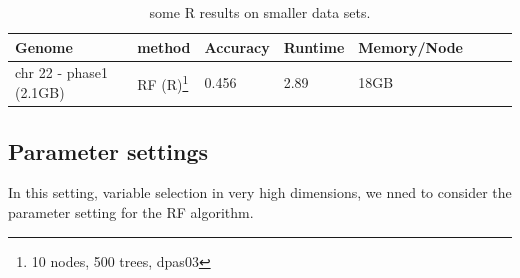\documentclass[10pt,letterpaper]{article}
\begin{document}
\begin{table}
\begin{minipage}{\textwidth}
\begin{center}
\begin{tabular}{|p{4.2cm}|l|l|l|l|l|l|l|}
\hline
\bf{Genome }  & \bf{method} & \bf{Accuracy} & \bf{Runtime} & \bf{Memory/Node} \\
\hline
 chr 22 - phase1 (2.1GB)  &  RF (R)\footnote{10 nodes, 500 trees, dpas03} 
                                   &  0.456 & 2.89 & 18GB \\ \hline
\end{tabular}
\medskip
\begin{flushleft} 
\caption{some R results on smaller data sets.}
\label{table:model_outputs}
\end{flushleft}
\end{center}
\end{minipage}
\end{table}









\subsection*{Parameter settings}
In this setting, variable selection in very high dimensions, we nned to consider the parameter setting for the RF
algorithm. 
\end{document}
